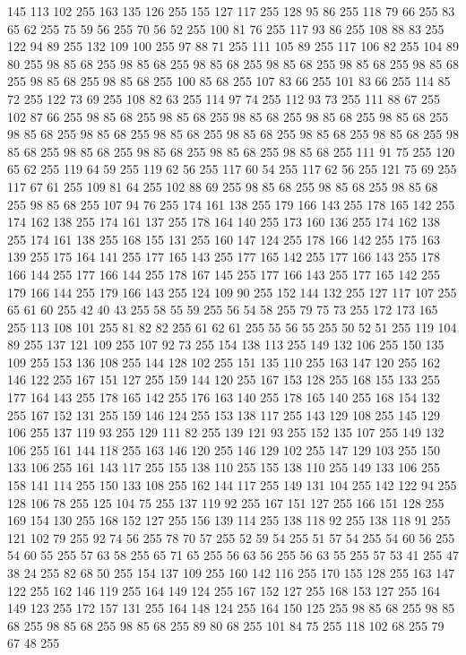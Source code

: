 145 113 102 255 163 135 126 255 155 127 117 255 128 95 86 255 118 79 66 255 83 65 62 255 75 59 56 255 70 56 52 255 100 81 76 255 117 93 86 255 108 88 83 255 122 94 89 255 132 109 100 255 97 88 71 255 111 105 89 255 117 106 82 255 104 89 80 255 98 85 68 255 98 85 68 255 98 85 68 255 98 85 68 255 98 85 68 255 98 85 68 255 98 85 68 255 98 85 68 255 100 85 68 255 107 83 66 255 101 83 66 255 114 85 72 255 122 73 69 255 108 82 63 255 114 97 74 255 112 93 73 255 111 88 67 255 102 87 66 255 98 85 68 255 98 85 68 255 98 85 68 255 98 85 68 255 98 85 68 255 98 85 68 255 98 85 68 255 98 85 68 255 98 85 68 255 98 85 68 255 98 85 68 255 98 85 68 255 98 85 68 255 98 85 68 255 98 85 68 255 98 85 68 255 111 91 75 255 120 65 62 255 119 64 59 255 119 62 56 255 117 60 54 255 117 62 56 255 121 75 69 255 117 67 61 255 109 81 64 255 102 88 69 255 98 85 68 255 98 85 68 255 98 85 68 255
98 85 68 255 107 94 76 255 174 161 138 255 179 166 143 255 178 165 142 255 174 162 138 255 174 161 137 255 178 164 140 255 173 160 136 255 174 162 138 255 174 161 138 255 168 155 131 255 160 147 124 255 178 166 142 255 175 163 139 255 175 164 141 255 177 165 143 255 177 165 142 255 177 166 143 255 178 166 144 255 177 166 144 255 178 167 145 255 177 166 143 255 177 165 142 255 179 166 144 255 179 166 143 255 124 109 90 255 152 144 132 255 127 117 107 255 65 61 60 255 42 40 43 255 58 55 59 255 56 54 58 255 79 75 73 255 172 173 165 255 113 108 101 255 81 82 82 255 61 62 61 255 55 56 55 255 50 52 51 255 119 104 89 255 137 121 109 255 107 92 73 255 154 138 113 255 149 132 106 255 150 135 109 255 153 136 108 255 144 128 102 255 151 135 110 255 163 147 120 255 162 146 122 255 167 151 127 255 159 144 120 255 167 153 128 255 168 155 133 255 177 164 143 255 178 165 142 255 176 163 140 255 178 165 140 255 168 154 132 255 167 152 131 255 159 146 124 255 153 138 117 255 143 129 108 255
145 129 106 255 137 119 93 255 129 111 82 255 139 121 93 255 152 135 107 255 149 132 106 255 161 144 118 255 163 146 120 255 146 129 102 255 147 129 103 255 150 133 106 255 161 143 117 255 155 138 110 255 155 138 110 255 149 133 106 255 158 141 114 255 150 133 108 255 162 144 117 255 149 131 104 255 142 122 94 255 128 106 78 255 125 104 75 255 137 119 92 255 167 151 127 255 166 151 128 255 169 154 130 255 168 152 127 255 156 139 114 255 138 118 92 255 138 118 91 255 121 102 79 255 92 74 56 255 78 70 57 255 52 59 54 255 51 57 54 255 54 60 56 255 54 60 55 255 57 63 58 255 65 71 65 255 56 63 56 255 56 63 55 255 57 53 41 255 47 38 24 255 82 68 50 255 154 137 109 255 160 142 116 255 170 155 128 255 163 147 122 255 162 146 119 255 164 149 124 255 167 152 127 255 168 153 127 255 164 149 123 255 172 157 131 255 164 148 124 255 164 150 125 255 98 85 68 255 98 85 68 255 98 85 68 255 98 85 68 255 89 80 68 255 101 84 75 255 118 102 68 255 79 67 48 255
